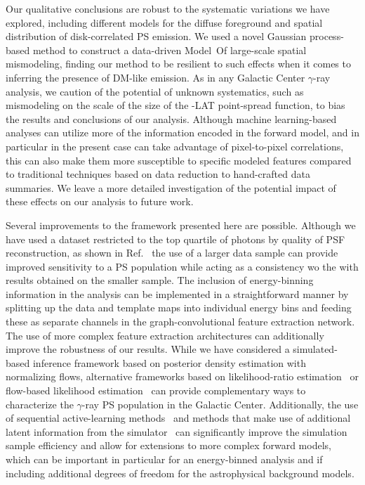 \documentclass[prd,aps,10pt,nofootinbib,twocolumn,superscriptaddress,preprintnumbers,balancelastpage,longbibliography,floatfix]{revtex4-2}
\begin{document}
Our qualitative conclusions are robust to the systematic variations we have explored, including different models for the diffuse foreground and spatial distribution of disk-correlated PS emission. We used a novel Gaussian process-based method to construct a data-driven {Model~O}f large-scale spatial mismodeling, finding our method to be resilient to such effects when it comes to inferring the presence of DM-like emission. As in any Galactic Center $\gamma$-ray analysis, we caution of the potential of unknown systematics, such as mismodeling on the scale of the size of the \Fermi-LAT point-spread function, to bias the results and conclusions of our analysis. Although machine learning-based analyses can utilize more of the information encoded in the forward model, and in particular in the present case can take advantage of pixel-to-pixel correlations, this can also make them more susceptible to specific modeled features compared to traditional techniques based on data reduction to hand-crafted data summaries. We leave a more detailed investigation of the potential impact of these effects on our analysis to future work.

Several improvements to the framework presented here are possible. Although we have used a dataset restricted to the top quartile of photons by quality of PSF reconstruction, as shown in Ref.~\cite{Leane:2020pfc} the use of a larger data sample can provide improved sensitivity to a PS population while acting as a consistency wo the with results obtained on the smaller sample. The inclusion of energy-binning information in the analysis can be implemented in a straightforward manner by splitting up the data and template maps into individual energy bins and feeding these as separate channels in the graph-convolutional feature extraction network. The use of more complex feature extraction architectures can additionally improve the robustness of our results. 
While we have considered a simulated-based inference framework based on posterior density estimation with normalizing flows, alternative frameworks based on likelihood-ratio estimation~\cite{Brehmer:2018eca,Brehmer:2018hga,Brehmer:2018kdj,Cranmer:2015bka, Hermans:2019ioj,Miller:2020hua,Miller:2021hys} or flow-based likelihood estimation~\cite{2019arXiv191200042W,pmlr-v89-papamakarios19a} can provide complementary ways to characterize the $\gamma$-ray PS population in the Galactic Center. Additionally, the use of sequential active-learning methods~\cite{pmlr-v89-papamakarios19a} and methods that make use of additional latent information from the simulator~\cite{Brehmer:2018eca,Brehmer:2018hga,Brehmer:2018kdj,Brehmer:2019xox,Stoye:2018ovl} can significantly improve the simulation sample efficiency and allow for extensions to more complex forward models, which can be important in particular for an energy-binned analysis and if including additional degrees of freedom for the astrophysical background models. 
\end{document}
